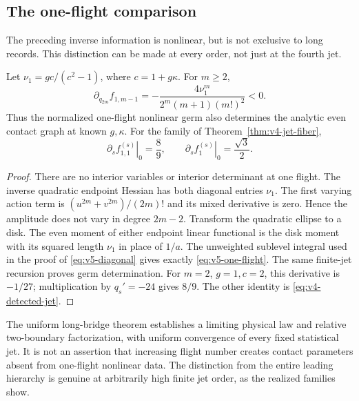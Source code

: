 \subsection{The one-flight comparison}
The preceding inverse information is nonlinear, but is not exclusive to
long records. This distinction can be made at every order, not just at
the fourth jet.
\begin{proposition}\label{prop:v5-one-flight}
Let $\nu_1=gc/(c^2-1)$, where $c=1+g\kappa$. For $m\ge2$,
\begin{equation}\label{eq:v5-one-flight}
 \partial_{q_{2m}}f_{1,m-1}
       =-\frac{4\nu_1^m}{2^m(m+1)(m!)^2}<0.
\end{equation}
Thus the normalized one-flight nonlinear germ also determines the
analytic even contact graph at known $g,\kappa$.
For the family of Theorem~\ref{thm:v4-jet-fiber},
\[
 \left.\partial_s f_{1,1}^{(s)}\right|_0=\frac89,
 \qquad \left.\partial_s f_1^{(s)}\right|_0=\frac{\sqrt3}{2}.
\]
\end{proposition}
\begin{proof}
There are no interior variables or interior determinant at one flight.
The inverse quadratic endpoint Hessian has both diagonal entries
$\nu_1$. The first varying action term is
$(u^{2m}+v^{2m})/(2m)!$ and its mixed derivative is zero. Hence the
amplitude does not vary in degree $2m-2$. Transform the quadratic
ellipse to a disk. The even moment of either endpoint linear functional
is the disk moment with its squared length $\nu_1$ in place of $1/a$.
The unweighted sublevel integral used in the proof of
\eqref{eq:v5-diagonal} gives exactly \eqref{eq:v5-one-flight}.
The same finite-jet recursion proves germ determination. For $m=2$,
$g=1,c=2$, this derivative is $-1/27$; multiplication by
$q_s'=-24$ gives $8/9$. The other identity is
\eqref{eq:v4-detected-jet}.
\end{proof}

The uniform long-bridge theorem establishes a limiting physical law and
relative two-boundary factorization, with uniform convergence of every
fixed statistical jet. It is not an assertion that increasing flight
number creates contact parameters absent from one-flight nonlinear
data. The distinction from the entire leading hierarchy is genuine at
arbitrarily high finite jet order, as the realized families show.
